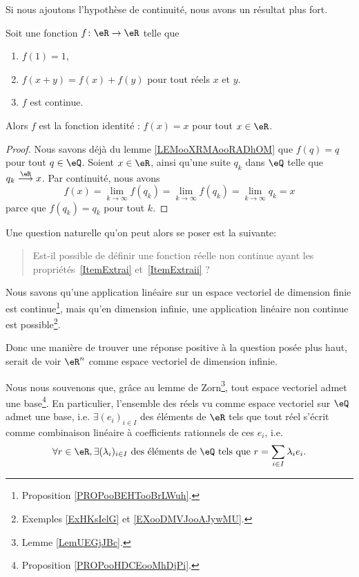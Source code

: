 Si nous ajoutons l'hypothèse de continuité, nous avons un résultat plus fort.
\begin{lemma}        \label{LEMooYKCUooUiIvPJ}
	Soit une fonction \( f\colon \eR\to \eR\) telle que
	\begin{enumerate}

		\item
		      \( f(1)=1\),

		\item
		      \( f(x+y)=f(x)+f(y)\) pour tout réels \( x\) et \( y\).
		\item
		      \( f\) est continue.
	\end{enumerate}
	Alors \( f\) est la fonction identité : \( f(x)=x\) pour tout \( x\in \eR\).
\end{lemma}

\begin{proof}
	Nous savons déjà du lemme \ref{LEMooXRMAooRADhOM} que \( f(q)=q\) pour tout \( q\in \eQ\). Soient \( x\in \eR\), ainsi qu'une suite \( q_k\) dans \( \eQ\) telle que \( q_k\stackrel{\eR}{\longrightarrow}x\). Par continuité, nous avons
	\begin{equation}
		f(x)=\lim_{k\to \infty} f(q_k)= \lim_{k\to \infty} f(q_k)=\lim_{k\to \infty} q_k=x
	\end{equation}
	parce que \( f(q_k)=q_k\) pour tout \( k\).
\end{proof}

Une question naturelle qu'on peut alors se poser est la suivante:
\begin{quote}
	Est-il possible de définir une fonction réelle non continue ayant les propriétés~\ref{ItemExtrai} et~\ref{ItemExtraii} ?
\end{quote}

Nous savons qu'une application linéaire sur un espace vectoriel de dimension finie est continue\footnote{Proposition \ref{PROPooBEHTooBrLWuh}.}, mais qu'en dimension infinie, une application linéaire non continue est possible\footnote{Exemples \ref{ExHKsIelG} et \ref{EXooDMVJooAJywMU}.}.

Donc une manière de trouver une réponse positive à la question posée plus haut, serait de voir \( \eR^n\) comme espace vectoriel de dimension infinie.

Nous nous souvenons que, grâce au lemme de Zorn\footnote{Lemme \ref{LemUEGjJBc}.}, tout espace vectoriel admet une base\footnote{Proposition \ref{PROPooHDCEooMhDjPi}.}. En particulier, l'ensemble des réels vu comme espace vectoriel sur \( \eQ\) admet une base, i.e. \( \exists (e_i)_{i\in I}\)  des éléments de \( \eR\) tels que tout réel s'écrit comme combinaison linéaire à coefficients rationnels  de ces \( e_i\), i.e.
\begin{equation}
	\forall r \in \eR, \exists (\lambda_i)_{i\in I} \text{ des éléments de } \eQ \text{ tels que  } r = \sum_{i\in I} \lambda_i e_i.
\end{equation}

